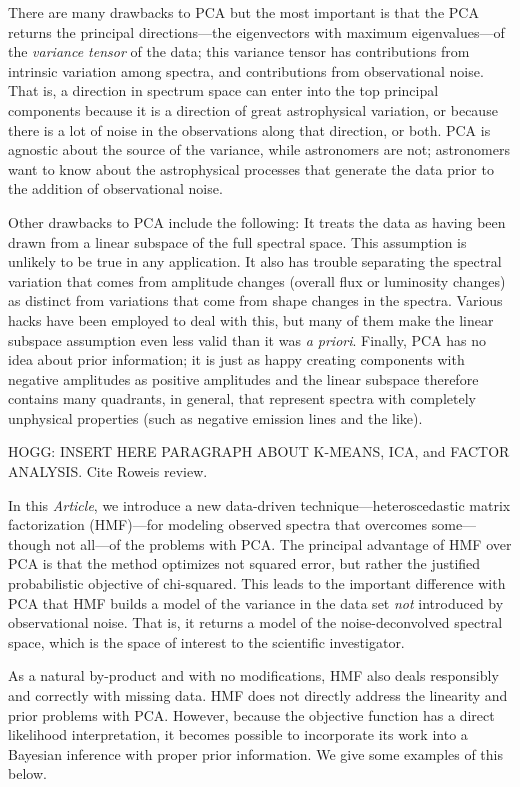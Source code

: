 \documentclass[12pt,preprint]{aastex}
\newcommand{\documentname}{\textsl{Article}}
\begin{document}
There are many drawbacks to PCA but the most important is that the PCA
returns the principal directions---the eigenvectors with maximum
eigenvalues---of the \emph{variance tensor} of the data; this variance
tensor has contributions from intrinsic variation among spectra, and
contributions from observational noise.  That is, a direction in
spectrum space can enter into the top principal components because it
is a direction of great astrophysical variation, or because there is a
lot of noise in the observations along that direction, or both.  PCA
is agnostic about the source of the variance, while astronomers are
not; astronomers want to know about the astrophysical processes that
generate the data prior to the addition of observational noise.

Other drawbacks to PCA include the following: It treats the data as
having been drawn from a linear subspace of the full spectral
space. This assumption is unlikely to be true in any application.  It
also has trouble separating the spectral variation that comes from
amplitude changes (overall flux or luminosity changes) as distinct
from variations that come from shape changes in the spectra.  Various
hacks have been employed to deal with this, but many of them make the
linear subspace assumption even less valid than it was \textit{a
  priori}. Finally, PCA has no idea about prior information; it is
just as happy creating components with negative amplitudes as positive
amplitudes and the linear subspace therefore contains many quadrants,
in general, that represent spectra with completely unphysical
properties (such as negative emission lines and the like).

HOGG: INSERT HERE PARAGRAPH ABOUT K-MEANS, ICA, and FACTOR ANALYSIS.
Cite Roweis review.

In this \documentname, we introduce a new data-driven
technique---heteroscedastic matrix factorization (HMF)---for modeling
observed spectra that overcomes some---though not all---of the
problems with PCA.  The principal advantage of HMF over PCA is that
the method optimizes not squared error, but rather the justified
probabilistic objective of chi-squared.  This leads to the important
difference with PCA that HMF builds a model of the variance in the
data set \emph{not} introduced by observational noise.  That is, it
returns a model of the noise-deconvolved spectral space, which is the
space of interest to the scientific investigator.

As a natural by-product and with no modifications, HMF also deals
responsibly and correctly with missing data.  HMF does not directly
address the linearity and prior problems with PCA.  However, because
the objective function has a direct likelihood interpretation, it
becomes possible to incorporate its work into a Bayesian inference
with proper prior information.  We give some examples of this below.
\end{document}
